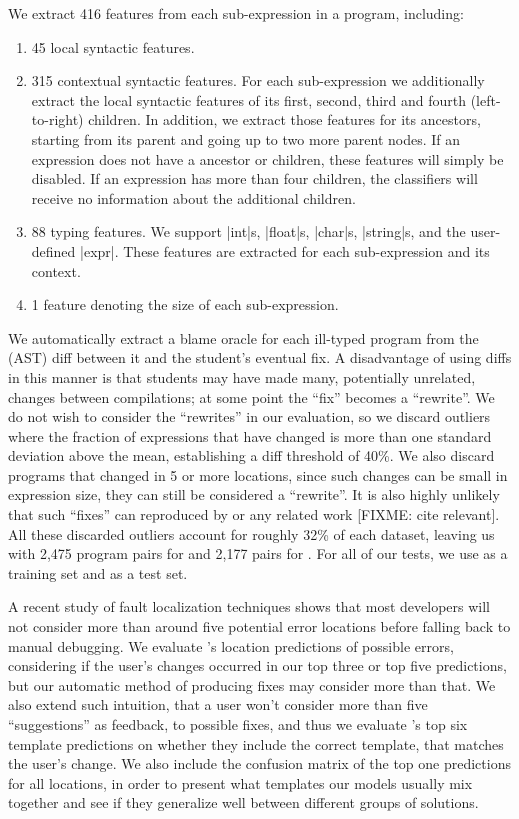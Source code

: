 We extract 416 features from each sub-expression in a
program, including:
%
\begin{enumerate}
  \item 45 local syntactic features.
  \item 315 contextual syntactic features. For each sub-expression we
    additionally extract the local syntactic features of its first, second,
    third and fourth (left-to-right) children. In addition, we extract those
    features for its ancestors, starting from its parent and going up to two
    more parent nodes. If an expression does not have a ancestor or children,
    these features will simply be disabled. If an expression has more than four
    children, the classifiers will receive no information about the additional
    children.
  \item 88 typing features. We support |int|s, |float|s, |char|s, |string|s, and
    the user-defined |expr|. These features are extracted for each
    sub-expression and its context.
  \item 1 feature denoting the size of each sub-expression.
\end{enumerate}

We automatically extract a blame oracle for each ill-typed program from the
(AST) diff between it and the student's eventual fix. A disadvantage of using
diffs in this manner is that students may have made many, potentially unrelated,
changes between compilations; at some point the ``fix'' becomes a ``rewrite''.
We do not wish to consider the ``rewrites'' in our evaluation, so we discard
outliers where the fraction of expressions that have changed is more than one
standard deviation above the mean, establishing a diff threshold of 40\%. We
also discard programs that changed in 5 or more locations, since such changes
can be small in expression size, they can still be considered a ``rewrite''. It
is also highly unlikely that such ``fixes'' can reproduced by \toolname or any
related work [FIXME: cite relevant]. All these discarded outliers account for
roughly 32\% of each dataset, leaving us with 2,475 program pairs for \SPRING
and 2,177 pairs for \FALL. For all of our tests, we use \SPRING as a training
set and \FALL as a test set.

A recent study of fault localization techniques \citep[][]{Kochhar2016-oc} shows
that most developers will not consider more than around five potential error
locations before falling back to manual debugging. We evaluate \toolname's
location predictions of possible errors, considering if the user's changes
occurred in our top three or top five predictions, but our automatic method of
producing fixes may consider more than that. We also extend such intuition, that
a user won't consider more than five ``suggestions'' as feedback, to possible
fixes, and thus we evaluate \toolname's top six template predictions on whether
they include the correct template, that matches the user's change. We also
include the confusion matrix of the top one predictions for all locations, in
order to present what templates our models usually mix together and see if they
generalize well between different groups of solutions.

